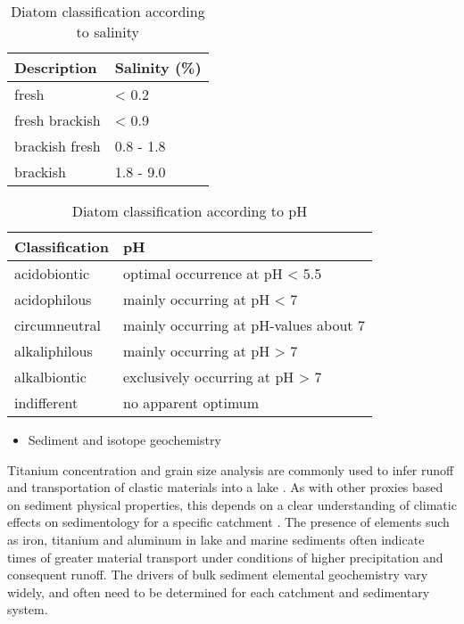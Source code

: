 \documentclass[
  12pt,
]{book}
\providecommand{\tightlist}{%
  \setlength{\itemsep}{0pt}\setlength{\parskip}{0pt}}
\begin{document}
\begin{table}

\caption{\label{tab:tb-diat}Diatom classification according to salinity}
\centering
\begin{tabular}[t]{ll}
\toprule
Description & Salinity (\%)\\
\midrule
fresh & < 0.2\\
fresh brackish & < 0.9\\
brackish fresh & 0.8 - 1.8\\
brackish & 1.8 - 9.0\\
\bottomrule
\end{tabular}
\end{table}



\begin{table}

\caption{\label{tab:tb-diat2}Diatom classification according to pH}
\centering
\begin{tabular}[t]{ll}
\toprule
Classification & pH\\
\midrule
acidobiontic & optimal occurrence at pH < 5.5\\
acidophilous & mainly occurring at pH < 7\\
circumneutral & mainly occurring at pH-values about 7\\
alkaliphilous & mainly occurring at pH > 7\\
alkalbiontic & exclusively occurring at pH > 7\\
\addlinespace
indifferent & no apparent optimum\\
\bottomrule
\end{tabular}
\end{table}



\begin{itemize}
\tightlist
\item
  Sediment and isotope geochemistry
\end{itemize}

Titanium concentration and grain size analysis are commonly used to infer runoff and transportation of clastic materials into a lake \citep{vazquezHolocenePaleohydrologyEtzatlanMagdalena2017}. As with other proxies based on sediment physical properties, this depends on a clear understanding of climatic effects on sedimentology for a specific catchment \citep{douglasMethodsFutureDirections2016}. The presence of elements such as iron, titanium and aluminum in lake and marine sediments often indicate times of greater material transport under conditions of higher precipitation and consequent runoff. The drivers of bulk sediment elemental geochemistry vary widely, and often need to be determined for each catchment and sedimentary system.
\end{document}
